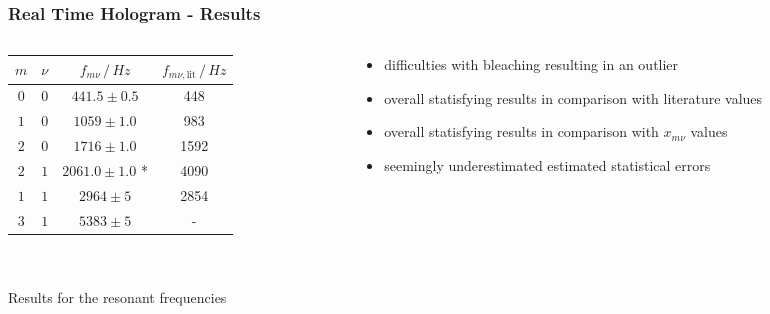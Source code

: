 \documentclass[10pt]{beamer}
\begin{document}
\begin{frame}
	\frametitle{Real Time Hologram - Results}
	\begin{columns}
		\begin{column}{0.6\textwidth}
			\begin{table}
				\centering
				\begin{tabular}{c|c|c|c}
					$m$ & $\nu$ 		& $f_{m\nu}\,/\,\si{Hz}$ 	& $f_{m\nu, \text{lit}}\,/\,\si{Hz}$\\ \hline\hline
					$0$&$0$	& $441.5\pm0.5$					& 448	\\ \hline
					$1$&$0$	& $1059\pm1.0$				& 983	\\ \hline
					$2$&$0$	& $1716\pm1.0$				& 1592	\\ \hline
					$2$&$1$	& $2061.0\pm1.0$ *				& 4090	\\ \hline
					$1$&$1$	& $2964\pm5$				& 2854 \\ \hline
					$3$&$1$	& $5383\pm5$				&-
				\end{tabular}\\\scriptsize\ \\\small
				{Results for the resonant frequencies\footnotemark}
			\end{table}		
		\end{column}
		\pause
				\begin{column}{0.5\textwidth}
					\begin{itemize}
						\item difficulties with bleaching resulting in an outlier
		                \item overall statisfying results in comparison with literature values 
		          \item  overall statisfying results in comparison with $x_{m\nu}$ values
		           \item seemingly underestimated estimated statistical errors
					\end{itemize}
				\end{column}
	\end{columns}
\end{frame}
\end{document}
